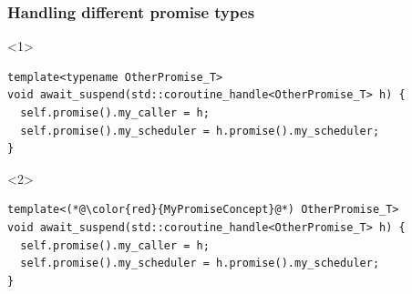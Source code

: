 \documentclass[aspectratio=169]{beamer}
\begin{document}
\begin{frame}[fragile]
  \frametitle{Handling different promise types}

  \begin{onlyenv}<1>
  \begin{lstlisting}[style=cpp20]
template<typename OtherPromise_T>
void await_suspend(std::coroutine_handle<OtherPromise_T> h) {
  self.promise().my_caller = h;
  self.promise().my_scheduler = h.promise().my_scheduler;
}
  \end{lstlisting}
  \end{onlyenv}
  \begin{onlyenv}<2>
  \begin{lstlisting}[style=cpp20]
template<(*@\color{red}{MyPromiseConcept}@*) OtherPromise_T>
void await_suspend(std::coroutine_handle<OtherPromise_T> h) {
  self.promise().my_caller = h;
  self.promise().my_scheduler = h.promise().my_scheduler;
}
  \end{lstlisting}
  \end{onlyenv}
\end{frame}
\end{document}
